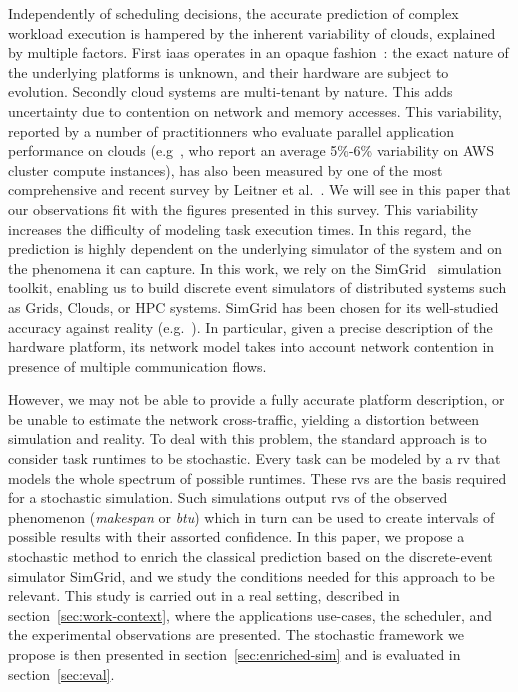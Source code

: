\documentclass[]{llncs}
\begin{document}
Independently  of  scheduling  decisions,  the accurate  prediction  of  complex
workload execution is hampered by  the inherent variability of clouds, explained
by multiple factors.  First \ac{iaas} operates  in an opaque fashion~: the exact
nature of the underlying platforms is unknown, and their hardware are subject to
evolution.   Secondly  cloud systems  are  multi-tenant  by nature.   This  adds
uncertainty due to contention on network and memory accesses.  This variability,
reported  by  a  number  of practitionners  who  evaluate  parallel  application
performance  on  clouds  (e.g~\cite{MehrotraDHHJLSB16}, who  report  an  average
5\%-6\% variability on AWS cluster compute instances), has also been measured by
one   of   the   most   comprehensive   and  recent   survey   by   Leitner   et
al.~\cite{LeitnerC16}.  We will see in this paper that our observations fit with
the figures presented in this survey.
%
This  variability increases  the difficulty  of modeling task execution  times.
In this regard,  the prediction is highly dependent on  the underlying simulator
of the system and on the phenomena it can capture.  In this work, we rely on the
SimGrid~\cite{simgrid} simulation  toolkit, enabling us to  build discrete event
simulators of distributed systems such as Grids, Clouds, or HPC systems. SimGrid
has   been    chosen   for    its   well-studied   accuracy    against   reality
(e.g.~\cite{StanisicTLVM15,VelhoSCL13}).    In  particular,   given  a   precise
description  of the  hardware platform,  its  network model  takes into  account
network contention in presence of multiple communication flows.

However, we may not be able to provide a fully accurate platform description, or
be unable to  estimate the network cross-traffic, yielding  a distortion between
simulation and reality.  To deal with  this problem, the standard approach is to
consider task runtimes to be stochastic. Every  task can be modeled by a \ac{rv}
that models  the whole  spectrum of  possible runtimes.  These \acp{rv}  are the
basis required for a stochastic simulation.  Such simulations output \acp{rv} of
the observed phenomenon  (\emph{makespan} or \emph{\ac{btu}}) which  in turn can
be used to create intervals of possible results with their assorted confidence.
%
In this paper, we propose a stochastic method to enrich the classical prediction
based  on the  discrete-event simulator  SimGrid,  and we  study the  conditions
needed for  this approach to be  relevant. This study  is carried out in  a real
setting,  described in  section~\ref{sec:work-context},  where the  applications
use-cases, the scheduler, and the  experimental observations are presented.  The
stochastic     framework     we     propose     is     then     presented     in
section~\ref{sec:enriched-sim}  and is  evaluated in  section~\ref{sec:eval}. %
\end{document}
